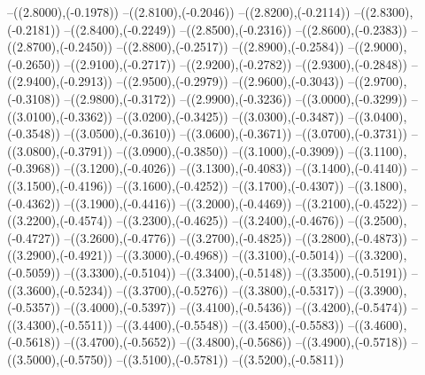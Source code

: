 {	--({\sx*(2.8000)},{\sy*(-0.1978)})
	--({\sx*(2.8100)},{\sy*(-0.2046)})
	--({\sx*(2.8200)},{\sy*(-0.2114)})
	--({\sx*(2.8300)},{\sy*(-0.2181)})
	--({\sx*(2.8400)},{\sy*(-0.2249)})
	--({\sx*(2.8500)},{\sy*(-0.2316)})
	--({\sx*(2.8600)},{\sy*(-0.2383)})
	--({\sx*(2.8700)},{\sy*(-0.2450)})
	--({\sx*(2.8800)},{\sy*(-0.2517)})
	--({\sx*(2.8900)},{\sy*(-0.2584)})
	--({\sx*(2.9000)},{\sy*(-0.2650)})
	--({\sx*(2.9100)},{\sy*(-0.2717)})
	--({\sx*(2.9200)},{\sy*(-0.2782)})
	--({\sx*(2.9300)},{\sy*(-0.2848)})
	--({\sx*(2.9400)},{\sy*(-0.2913)})
	--({\sx*(2.9500)},{\sy*(-0.2979)})
	--({\sx*(2.9600)},{\sy*(-0.3043)})
	--({\sx*(2.9700)},{\sy*(-0.3108)})
	--({\sx*(2.9800)},{\sy*(-0.3172)})
	--({\sx*(2.9900)},{\sy*(-0.3236)})
	--({\sx*(3.0000)},{\sy*(-0.3299)})
	--({\sx*(3.0100)},{\sy*(-0.3362)})
	--({\sx*(3.0200)},{\sy*(-0.3425)})
	--({\sx*(3.0300)},{\sy*(-0.3487)})
	--({\sx*(3.0400)},{\sy*(-0.3548)})
	--({\sx*(3.0500)},{\sy*(-0.3610)})
	--({\sx*(3.0600)},{\sy*(-0.3671)})
	--({\sx*(3.0700)},{\sy*(-0.3731)})
	--({\sx*(3.0800)},{\sy*(-0.3791)})
	--({\sx*(3.0900)},{\sy*(-0.3850)})
	--({\sx*(3.1000)},{\sy*(-0.3909)})
	--({\sx*(3.1100)},{\sy*(-0.3968)})
	--({\sx*(3.1200)},{\sy*(-0.4026)})
	--({\sx*(3.1300)},{\sy*(-0.4083)})
	--({\sx*(3.1400)},{\sy*(-0.4140)})
	--({\sx*(3.1500)},{\sy*(-0.4196)})
	--({\sx*(3.1600)},{\sy*(-0.4252)})
	--({\sx*(3.1700)},{\sy*(-0.4307)})
	--({\sx*(3.1800)},{\sy*(-0.4362)})
	--({\sx*(3.1900)},{\sy*(-0.4416)})
	--({\sx*(3.2000)},{\sy*(-0.4469)})
	--({\sx*(3.2100)},{\sy*(-0.4522)})
	--({\sx*(3.2200)},{\sy*(-0.4574)})
	--({\sx*(3.2300)},{\sy*(-0.4625)})
	--({\sx*(3.2400)},{\sy*(-0.4676)})
	--({\sx*(3.2500)},{\sy*(-0.4727)})
	--({\sx*(3.2600)},{\sy*(-0.4776)})
	--({\sx*(3.2700)},{\sy*(-0.4825)})
	--({\sx*(3.2800)},{\sy*(-0.4873)})
	--({\sx*(3.2900)},{\sy*(-0.4921)})
	--({\sx*(3.3000)},{\sy*(-0.4968)})
	--({\sx*(3.3100)},{\sy*(-0.5014)})
	--({\sx*(3.3200)},{\sy*(-0.5059)})
	--({\sx*(3.3300)},{\sy*(-0.5104)})
	--({\sx*(3.3400)},{\sy*(-0.5148)})
	--({\sx*(3.3500)},{\sy*(-0.5191)})
	--({\sx*(3.3600)},{\sy*(-0.5234)})
	--({\sx*(3.3700)},{\sy*(-0.5276)})
	--({\sx*(3.3800)},{\sy*(-0.5317)})
	--({\sx*(3.3900)},{\sy*(-0.5357)})
	--({\sx*(3.4000)},{\sy*(-0.5397)})
	--({\sx*(3.4100)},{\sy*(-0.5436)})
	--({\sx*(3.4200)},{\sy*(-0.5474)})
	--({\sx*(3.4300)},{\sy*(-0.5511)})
	--({\sx*(3.4400)},{\sy*(-0.5548)})
	--({\sx*(3.4500)},{\sy*(-0.5583)})
	--({\sx*(3.4600)},{\sy*(-0.5618)})
	--({\sx*(3.4700)},{\sy*(-0.5652)})
	--({\sx*(3.4800)},{\sy*(-0.5686)})
	--({\sx*(3.4900)},{\sy*(-0.5718)})
	--({\sx*(3.5000)},{\sy*(-0.5750)})
	--({\sx*(3.5100)},{\sy*(-0.5781)})
	--({\sx*(3.5200)},{\sy*(-0.5811)})
}

